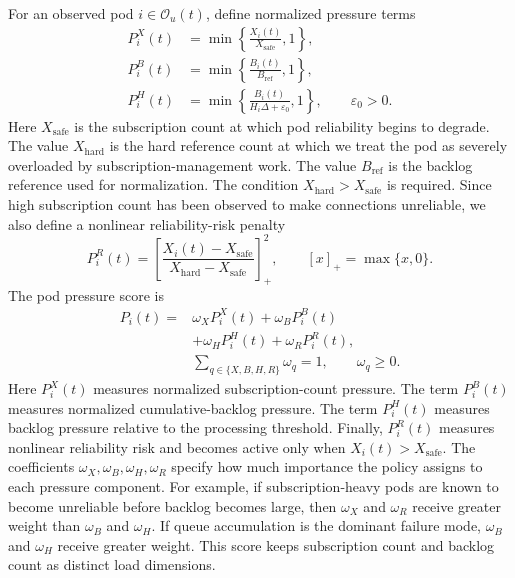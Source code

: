 \documentclass[manuscript,nonacm]{acmart}
\begin{document}
For an observed pod $i\in\mathcal{O}_u(t)$, define normalized pressure terms
\begin{align}
	P^X_i(t) &= \min\left\{\frac{X_i(t)}{X_{\mathrm{safe}}},1\right\},\\
	P^B_i(t) &= \min\left\{\frac{B_i(t)}{B_{\mathrm{ref}}},1\right\},\\
	P^H_i(t) &= \min\left\{\frac{B_i(t)}{H_i\Delta+\varepsilon_0},1\right\},
	\qquad \varepsilon_0>0.
\end{align}
Here $X_{\mathrm{safe}}$ is the subscription count at which pod reliability begins to
degrade. The value $X_{\mathrm{hard}}$ is the hard reference count at which we treat the
pod as severely overloaded by subscription-management work.
The value $B_{\mathrm{ref}}$ is the backlog reference used for normalization. The condition
$X_{\mathrm{hard}}>X_{\mathrm{safe}}$ is required. Since high subscription count has been
observed to make connections unreliable, we also define a nonlinear
reliability-risk penalty
\begin{equation}
	P^R_i(t)=
	\left[
	\frac{X_i(t)-X_{\mathrm{safe}}}
	{X_{\mathrm{hard}}-X_{\mathrm{safe}}}
	\right]_+^2,
	\qquad [x]_+=\max\{x,0\}.
\end{equation}
The pod pressure score is
\begin{align}
	P_i(t)=
	&\omega_X P^X_i(t)
	+\omega_B P^B_i(t) \nonumber\\
	&+\omega_H P^H_i(t)
	+\omega_R P^R_i(t),
	\label{eq:pod_pressure}\\
	&\sum_{q\in\{X,B,H,R\}}\omega_q=1,\qquad \omega_q\geq 0. \nonumber
\end{align}
Here $P^X_i(t)$ measures normalized subscription-count pressure.
The term $P^B_i(t)$ measures normalized cumulative-backlog pressure.
The term $P^H_i(t)$ measures backlog pressure relative to the processing threshold.
Finally, $P^R_i(t)$ measures nonlinear reliability risk and becomes active only
when $X_i(t)>X_{\mathrm{safe}}$. The coefficients
$\omega_X,\omega_B,\omega_H,\omega_R$ specify how much importance the policy
assigns to each pressure component. For example, if subscription-heavy pods are
known to become unreliable before backlog becomes large, then $\omega_X$ and
$\omega_R$ receive greater weight than $\omega_B$ and $\omega_H$. If queue
accumulation is the dominant failure mode, $\omega_B$ and $\omega_H$
receive greater weight. This score keeps subscription count and backlog
count as distinct load dimensions.
\end{document}

